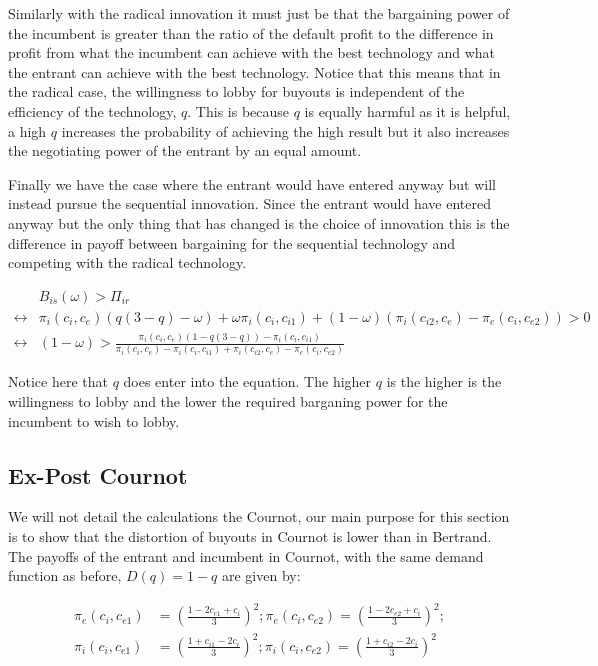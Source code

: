 \documentclass[12pt]{report}
\numberwithin{equation}{section}
\begin{document}
Similarly with the radical innovation it must just be that the bargaining power of the incumbent is greater than the ratio of the default profit to the difference in profit from what the incumbent can achieve with the best technology and what the entrant can achieve with the best technology. Notice that this means that in the radical case, the willingness to lobby for buyouts is independent of the efficiency of the technology, $q$. This is because $q$ is equally harmful as it is helpful, a high $q$ increases the probability of achieving the high result but it also increases the negotiating power of the entrant by an equal amount. 

Finally we have the case where the entrant would have entered anyway but will instead pursue the sequential innovation. Since the entrant would have entered anyway but the only thing that has changed is the choice of innovation this is the difference in payoff between bargaining for the sequential technology and competing with the radical technology. 

\begin{align*}
&B_{is}(\omega)>\Pi_{ir} \\
\leftrightarrow &\pi_i(c_i,c_e)(q(3-q) -\omega) 
+\omega \pi_i(c_i,c_{i1}) 
 +(1-\omega)(\pi_i(c_{i2},c_e)-\pi_e(c_{i},c_{e2})) 
> 0 \\
\leftrightarrow &
(1-\omega)> \frac{\pi_i(c_i,c_e)(1-q(3-q))-\pi_i(c_i,c_{i1})}{\pi_i(c_i,c_e)-\pi_i(c_i,c_{i1})+\pi_i(c_{i2},c_e)-\pi_e(c_{i},c_{e2})}  
\end{align*}

Notice here that $q$ does enter into the equation. The higher $q$ is the higher is the willingness to lobby and the lower the required barganing power for the incumbent to wish to lobby. 

\subsection{Ex-Post Cournot}

We will not detail the calculations the Cournot, our main purpose for this section is to show that the distortion of buyouts in Cournot is lower than in Bertrand. The payoffs of the entrant and incumbent in Cournot, with the same demand function as before, $D(q)=1-q$ are given by:

\begin{align*}
\pi_{e}(c_i,c_{e1}) &= \left(\frac{1-2 c_{e1}+c_{i}}{3}  \right)^2;
\pi_{e}(c_i,c_{e2}) = \left(\frac{1-2 c_{e2}+c_{i}}{3}  \right)^2; \\
\pi_{i}(c_i,c_{e1}) &= \left(\frac{1+ c_{i1}-2c_{i}}{3}  \right)^2;
\pi_{i}(c_i,c_{e2}) = \left(\frac{1+ c_{i2}-2c_{i}}{3}  \right)^2 \\
\end{align*}
\end{document}
